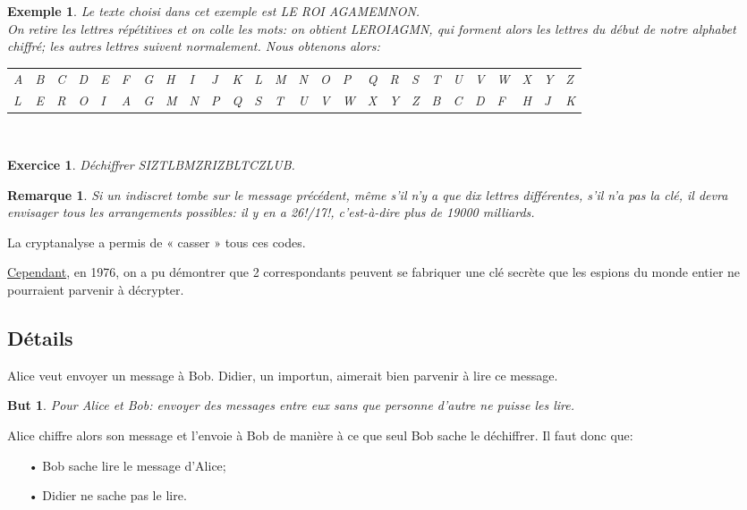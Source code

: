 \documentclass[12pt]{report}
\newtheorem*{ex}{Exemple}
\newtheorem*{exo}{Exercice}
\newtheorem*{rem}{Remarque}
\newtheorem*{but}{But}
\begin{document}
\begin{ex}
Le texte choisi dans cet exemple est LE ROI AGAMEMNON.\\
On retire les lettres répétitives et on colle les mots: on obtient LEROIAGMN, qui forment alors les lettres du début de notre alphabet chiffré; les autres lettres suivent normalement. Nous obtenons alors:
  
\begin{tabular}{p{0.1cm}p{0.1cm}p{0.1cm}p{0.1cm}p{0.1cm}p{0.1cm}p{0.1cm}p{0.1cm}p{0.1cm}p{0.1cm}p{0.1cm}p{0.1cm}p{0.1cm}p{0.1cm}p{0.1cm}p{0.1cm}p{0.1cm}p{0.1cm}p{0.1cm}p{0.1cm}p{0.1cm}p{0.1cm}p{0.1cm}p{0.1cm}p{0.1cm}p{0.1cm}}
 A & B & C & D & E & F & G & H & I & J & K & L & M & N &O &P & Q & R & S & T & U & V & W & X & Y & Z   \\
L & E & R & O & I & A & G & M & N & P & Q  & S & T & U & V & W & X & Y & Z & B & C & D & F & H & J & K 
\end{tabular}\\  
\end{ex}
 
\begin{exo}
Déchiffrer SIZTLBMZRIZBLTCZLUB.
\end{exo}  
  
\begin{rem}
Si un indiscret tombe sur le message précédent, même s'il n'y a que dix lettres différentes, s'il n'a pas la clé, il devra envisager tous les arrangements possibles: il y en a 26!/17!, c'est-à-dire plus de 19000 milliards.
\end{rem}  

La cryptanalyse a permis de « casser » tous ces codes.

\underline{Cependant}, en 1976, on a pu démontrer que 2 correspondants peuvent se fabriquer une clé secrète que les espions du monde entier ne pourraient parvenir à décrypter.

\subsection*{Détails}


Alice veut envoyer un message à Bob. Didier, un importun, aimerait bien parvenir à lire ce message.

\begin{but}
Pour Alice et Bob: envoyer des messages entre eux sans que personne d'autre ne puisse les lire.
\end{but}

Alice chiffre alors son message et l'envoie à Bob de manière à ce que seul Bob sache le déchiffrer. Il faut donc que:
\begin{itemize}
\item[•] Bob sache lire le message d'Alice;
\item[•] Didier ne sache pas le lire.
\end{itemize}
\end{document}
